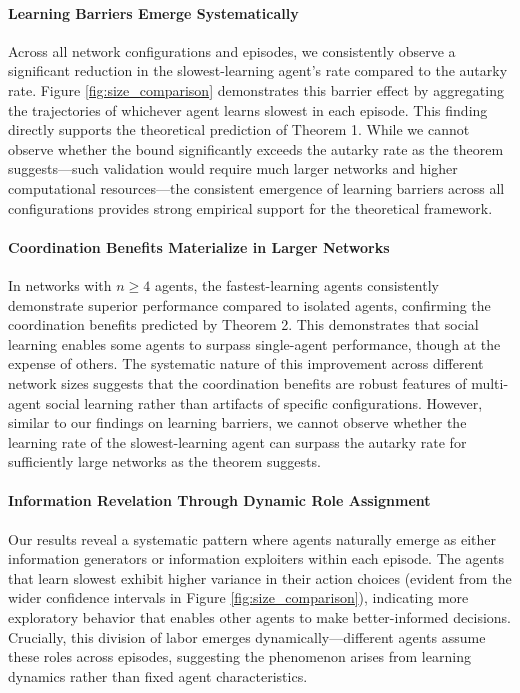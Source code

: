 \paragraph{Learning Barriers Emerge Systematically} Across all network configurations and episodes, we consistently observe a significant reduction in the slowest-learning agent's rate compared to the autarky rate. Figure \ref{fig:size_comparison} demonstrates this barrier effect by aggregating the trajectories of whichever agent learns slowest in each episode. This finding directly supports the theoretical prediction of Theorem 1. While we cannot observe whether the bound significantly exceeds the autarky rate as the theorem suggests—such validation would require much larger networks and higher computational resources—the consistent emergence of learning barriers across all configurations provides strong empirical support for the theoretical framework.

\paragraph{Coordination Benefits Materialize in Larger Networks} In networks with $n \geq 4$ agents, the fastest-learning agents consistently demonstrate superior performance compared to isolated agents, confirming the coordination benefits predicted by Theorem 2. This demonstrates that social learning enables some agents to surpass single-agent performance, though at the expense of others. The systematic nature of this improvement across different network sizes suggests that the coordination benefits are robust features of multi-agent social learning rather than artifacts of specific configurations. However, similar to our findings on learning barriers, we cannot observe whether the learning rate of the slowest-learning agent can surpass the autarky rate for sufficiently large networks as the theorem suggests.

\paragraph{Information Revelation Through Dynamic Role Assignment} Our results reveal a systematic pattern where agents naturally emerge as either information generators or information exploiters within each episode. The agents that learn slowest exhibit higher variance in their action choices (evident from the wider confidence intervals in Figure \ref{fig:size_comparison}), indicating more exploratory behavior that enables other agents to make better-informed decisions. Crucially, this division of labor emerges dynamically—different agents assume these roles across episodes, suggesting the phenomenon arises from learning dynamics rather than fixed agent characteristics.


